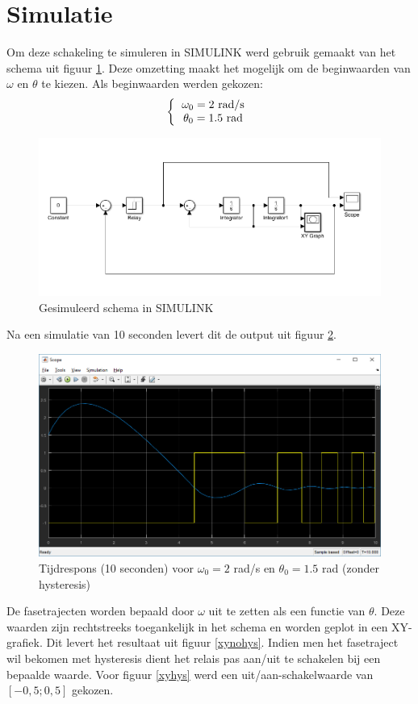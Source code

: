 \documentclass[12pt]{article}
\begin{document}
\section{Simulatie}
Om deze schakeling te simuleren in SIMULINK werd gebruik gemaakt van het schema uit figuur \ref{simulinkschema}. Deze omzetting maakt het mogelijk om de beginwaarden van $\omega$ en $\theta$ te kiezen. Als beginwaarden werden gekozen:
\[ 
\left \{
  \begin{tabular}{c}
  $\omega_0 = 2$ rad/s \\
  $\theta_0 = 1.5$ rad
  \end{tabular}
\right. 
\]
\begin{figure}[]
	\centering
	\includegraphics[width=\textwidth, keepaspectratio]{simulinkschema.png}
	\caption{Gesimuleerd schema in SIMULINK}
	\label{simulinkschema}
\end{figure}
Na een simulatie van 10 seconden levert dit de output uit figuur \ref{output1}.
\begin{figure}[]
	\centering
	\includegraphics[width=\textwidth, keepaspectratio]{output1.png}
	\caption{Tijdrespons (10 seconden) voor $\omega_0 = 2$ rad/s en $\theta_0 = 1.5$ rad (zonder hysteresis)}
	\label{output1}
\end{figure}
\newpage
\noindent De fasetrajecten worden bepaald door $\omega$ uit te zetten als een functie van $\theta$. Deze waarden zijn rechtstreeks toegankelijk in het schema en worden geplot in een XY-grafiek. Dit levert het resultaat uit figuur \ref{xynohys}. Indien men het fasetraject wil bekomen met hysteresis dient het relais pas aan/uit te schakelen bij een bepaalde waarde. Voor figuur \ref{xyhys} werd een uit/aan-schakelwaarde van $[-0,5;0,5]$ gekozen. \\ \\
\end{document}
